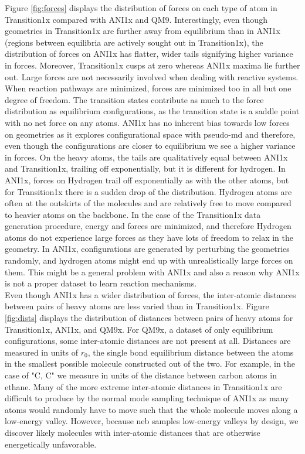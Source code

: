 \documentclass[twoside,twocolumn]{article}
\begin{document}
Figure \ref{fig:forces} displays the distribution of forces on each type of atom in Transition1x compared with ANI1x and QM9. Interestingly, even though geometries in Transition1x are further away from equilibrium than in ANI1x (regions between equilibria are actively sought out in Transition1x), the distribution of forces on ANI1x has flatter, wider tails signifying higher variance in forces. Moreover, Transition1x cusps at zero whereas ANI1x maxima lie further out. Large forces are not necessarily involved when dealing with reactive systems. When reaction pathways are minimized, forces are minimized too in all but one degree of freedom. The transition states contribute as much to the force distribution as equilibrium configurations, as the transition state is a saddle point with no net force on any atoms. ANI1x has no inherent bias towards low forces on geometries as it explores configurational space with pseudo-\gls{md} and therefore, even though the configurations are closer to equilibrium we see a higher variance in forces. On the heavy atoms, the tails are qualitatively equal between ANI1x and Transition1x, trailing off exponentially, but it is different for hydrogen. In ANI1x, forces on Hydrogen trail off exponentially as with the other atoms, but for Transition1x there is a sudden drop of the distribution.  Hydrogen atoms are often at the outskirts of the molecules and are relatively free to move compared to heavier atoms on the backbone. In the case of the Transition1x data generation procedure, energy and forces are minimized, and therefore Hydrogen atoms do not experience large forces as they have lots of freedom to relax in the geometry. In ANI1x, configurations are generated by perturbing the geometries randomly, and hydrogen atoms might end up with unrealistically large forces on them. This might be a general problem with ANI1x and also a reason why ANI1x is not a proper dataset to learn reaction mechanisms.
\\

Even though ANI1x has a wider distribution of forces, the inter-atomic distances between pairs of heavy atoms are less varied than in Transition1x. Figure \ref{fig:dists} displays the distribution of distances between pairs of heavy atoms for Transition1x, ANI1x, and QM9x. For QM9x, a dataset of only equilibrium configurations,  some inter-atomic distances are not present at all. Distances are measured in units of $r_0$, the single bond equilibrium distance between the atoms in the smallest possible molecule constructed out of the two. For example, in the case of "C, C" we measure in units of the distance between carbon atoms in ethane. Many of the more extreme inter-atomic distances in Transition1x are difficult to produce by the normal mode sampling technique of ANI1x as many atoms would randomly have to move such that the whole molecule moves along a low-energy valley. However, because \gls{neb} samples low-energy valleys by design, we discover likely molecules with inter-atomic distances that are otherwise energetically unfavorable.
\\
\end{document}
